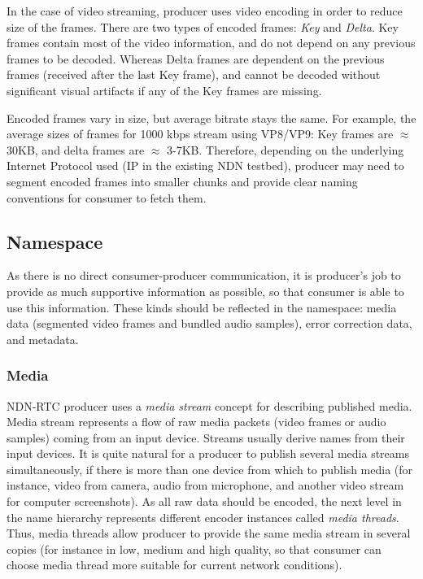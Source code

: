 \documentclass{icn/sig-alternate-2012} %
\newcommand{\ndnrtcName}{NDN-RTC} %
\begin{document}
In the case of video streaming, producer uses video encoding in order to reduce size of the frames. There are two types of encoded frames: \textit{Key} and \textit{Delta}. Key frames contain most of the video information, and do not depend on any previous frames to be decoded. Whereas Delta frames are dependent on the previous frames (received after the last Key frame), and cannot be decoded without significant visual artifacts if any of the Key frames are missing.

Encoded frames vary in size, but average bitrate stays the same. For example, the average sizes of frames for 1000 kbps stream using VP8/VP9: Key frames are $\approx$ 30KB, and delta frames are $\approx$ 3-7KB.
Therefore, depending on the underlying Internet Protocol used (IP in the existing NDN testbed), producer may need to segment encoded frames into smaller chunks and provide clear naming conventions for consumer to fetch them.




\subsection{Namespace}

As there is no direct consumer-producer communication, it is producer's job to provide as much supportive information as possible, so that consumer is able to use this information. These kinds should be reflected in the namespace:
media data (segmented video frames and bundled audio samples), error correction data, and metadata. 


\subsubsection{Media} 

\ndnrtcName{} producer uses a \textit{media stream} concept for describing published media. Media stream represents a flow of raw media packets (video frames or audio samples) coming from an input device. Streams usually derive names from their input devices. It is quite natural for a producer to publish several media streams simultaneously, if there is more than one device from which to publish media (for instance, video from camera, audio from microphone, and another video stream for computer screenshots). As all raw data should be encoded, the next level in the name hierarchy represents different encoder instances called \textit{media threads}. Thus, media threads allow producer to provide the same media stream in several copies (for instance in low, medium and high quality, so that consumer can choose media thread more suitable for current network conditions).
\end{document}
